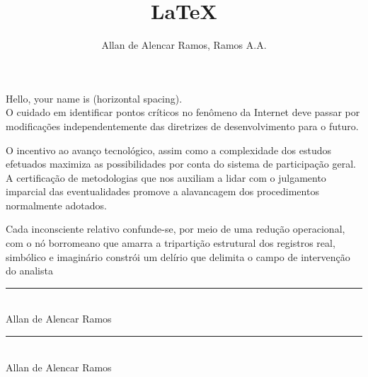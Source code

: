 \documentclass[12pt, a4paper, oneside]{book}
\begin{document}
\title{LaTeX}
\author{Allan de Alencar Ramos, Ramos A.A.} 
\maketitle

Hello, your name is \hspace{2cm} (horizontal spacing).\\

O cuidado em identificar pontos críticos no fenômeno da Internet deve passar por modificações independentemente das diretrizes de desenvolvimento para o futuro.

\hrulefill

O incentivo ao avanço tecnológico, assim como a complexidade dos estudos efetuados maximiza as possibilidades por conta do sistema de participação geral.\\

A certificação de metodologias que nos auxiliam a lidar com o julgamento imparcial das eventualidades promove a alavancagem dos procedimentos normalmente adotados.

\dotfill

Cada inconsciente relativo confunde-se, por meio de uma redução operacional, com o nó borromeano que amarra a tripartição estrutural dos registros real, simbólico e imaginário constrói um delírio que delimita o campo de intervenção do analista

\newpage
\begin{center}

\rule{10cm}{0.02cm}\\
Allan de Alencar Ramos

\vspace{2cm}

\rule{10cm}{0.02cm}\\
Allan de Alencar Ramos

\end{center}
\end{document}
